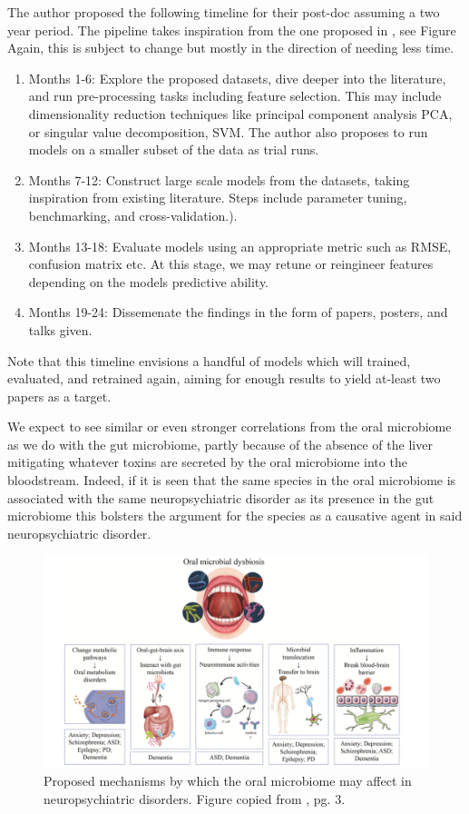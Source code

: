 \documentclass{article}
\begin{document}
\begin{multicols}{2}
The author proposed the following timeline for their post-doc assuming a two year period. The pipeline takes inspiration from the one proposed in \cite{li_machine_2022}, see Figure Again, this is subject to change but mostly in the direction of needing less time. 
\begin{enumerate}[label = \roman*.]
	\item Months 1-6: Explore the proposed datasets, dive deeper into the literature, and run pre-processing tasks including feature selection. This may include dimensionality reduction techniques like principal component analysis PCA, or singular value decomposition, SVM. The author also proposes to run models on a smaller subset of the data as trial runs.
	\item Months 7-12: Construct large scale models from the datasets, taking inspiration from existing literature. Steps include parameter tuning, benchmarking, and cross-validation.). 
	\item Months 13-18: Evaluate models using an appropriate metric such as RMSE, confusion matrix etc. At this stage, we may retune or reingineer features depending on the models predictive ability.
	\item Months 19-24: Dissemenate the findings in the form of papers, posters, and talks given. 
\end{enumerate}
Note that this timeline envisions a handful of models which will trained, evaluated, and retrained again, aiming for enough results to yield at-least two papers as a target.

We expect to see similar or even stronger correlations from the oral microbiome as we do with the gut microbiome, partly because of the absence of the liver mitigating whatever toxins are secreted by the oral microbiome into the bloodstream. Indeed, if it is seen that the same species in the oral microbiome is associated with the same neuropsychiatric disorder as its presence in the gut microbiome this bolsters the argument for the species as a causative agent in said neuropsychiatric disorder.


\begin{figure}[t]
\includegraphics[width = \textwidth]{../figures/dysbiosis-oral-diagram.png}
\caption{Proposed mechanisms by which the oral microbiome may affect in neuropsychiatric disorders. Figure copied from \cite{tao_relationship_2024}, pg. 3.}
\end{figure}\label{mouth}


\end{multicols}
\end{document}
